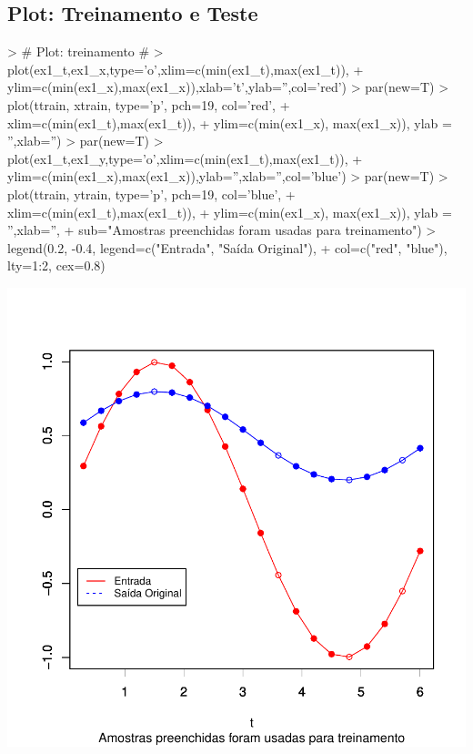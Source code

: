 \documentclass{article}
\begin{document}
\subsection{Plot: Treinamento e Teste}
\begin{Schunk}
\begin{Sinput}
> # Plot: treinamento #
> plot(ex1_t,ex1_x,type='o',xlim=c(min(ex1_t),max(ex1_t)), 
+      ylim=c(min(ex1_x),max(ex1_x)),xlab='t',ylab='',col='red')
> par(new=T)
> plot(ttrain, xtrain, type='p', pch=19, col='red',
+      xlim=c(min(ex1_t),max(ex1_t)), 
+      ylim=c(min(ex1_x), max(ex1_x)), ylab = '',xlab='')
> par(new=T)
> plot(ex1_t,ex1_y,type='o',xlim=c(min(ex1_t),max(ex1_t)),
+      ylim=c(min(ex1_x),max(ex1_x)),ylab='',xlab='',col='blue')
> par(new=T)
> plot(ttrain, ytrain, type='p', pch=19, col='blue',
+      xlim=c(min(ex1_t),max(ex1_t)), 
+      ylim=c(min(ex1_x), max(ex1_x)), ylab = '',xlab='',
+      sub="Amostras preenchidas foram usadas para treinamento")
> legend(0.2, -0.4, legend=c("Entrada", "Saída Original"),
+        col=c("red", "blue"), lty=1:2, cex=0.8)
\end{Sinput}
\end{Schunk}
\includegraphics{adaline-003}
\end{document}
